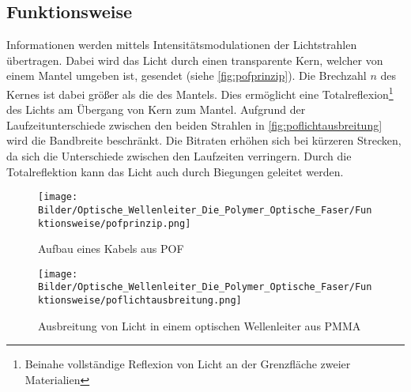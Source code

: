 \subsection{Funktionsweise}
\label{subsec:poffunktionsweise}

Informationen werden mittels Intensitätsmodulationen der Lichtstrahlen
übertragen. Dabei wird das Licht durch einen transparente Kern, welcher von
einem Mantel umgeben ist, gesendet (siehe \autoref{fig:pofprinzip}). Die
Brechzahl $n$ des Kernes ist dabei größer als die des Mantels. Dies ermöglicht
eine Totalreflexion\footnote{Beinahe vollständige Reflexion von Licht an der
Grenzfläche zweier Materialien} des Lichts am Übergang von Kern zum Mantel.
Aufgrund der Laufzeitunterschiede zwischen den beiden Strahlen in
\autoref{fig:poflichtausbreitung} wird die Bandbreite beschränkt. Die Bitraten
erhöhen sich bei kürzeren Strecken, da sich die Unterschiede zwischen den
Laufzeiten verringern. Durch die Totalreflektion kann das Licht auch durch
Biegungen geleitet werden.

\begin{figure}[h]
    \begin{center}
        \begin{minipage}[t]{0.4\textwidth}
            \begin{center}
                \texttt{[image: Bilder/Optische\_Wellenleiter\_Die\_Polymer\_Optische\_Faser/Funktionsweise/pofprinzip.png]}
                \caption[Aufbau eines Kabels aus POF \newline \url{http://www.pofac.fh-nuernberg.de/pofac/de/was_sind_pof/images/pof_prinzip.png} (zuletzt aufgerufen am 19.09.2015)]{Aufbau eines Kabels aus POF}
                \label{fig:pofprinzip}
            \end{center}
        \end{minipage}
        \hspace{0.025\textwidth}
        \begin{minipage}[t]{0.4\textwidth}
            \begin{center}
                \texttt{[image: Bilder/Optische\_Wellenleiter\_Die\_Polymer\_Optische\_Faser/Funktionsweise/poflichtausbreitung.png]}
                \caption[Ausbreitung von Licht in einem optischen Wellenleiter aus PMMA \newline \url{http://www.pofac.info/typo3temp/pics/7eee584dce.jpg} (zuletzt aufgerufen am 19.09.2015)]{Ausbreitung von Licht in einem optischen Wellenleiter aus PMMA}
                \label{fig:poflichtausbreitung}
            \end{center}
        \end{minipage}
    \end{center}
\end{figure}
